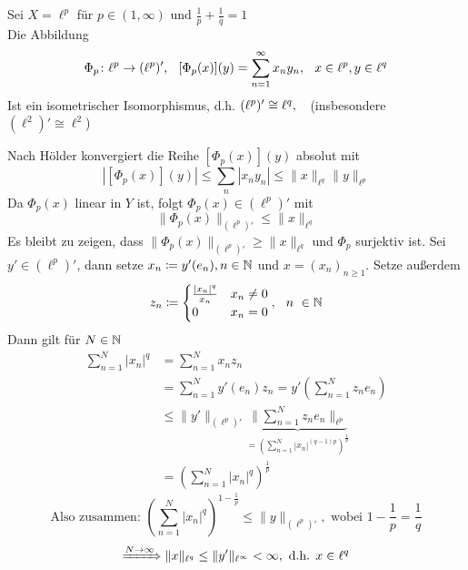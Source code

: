 \begin{beispiel}
	Sei $X = \ell^{p}$ für $p \in (1, \infty)$ und $\frac{1}{p} + \frac{1}{q} = 1$ \\
	Die Abbildung
	\[ \Phi_{p} \colon \ell^{p} \rightarrow (\ell^{p})', \hspace{0.25cm} [\Phi_{p}(x)](y) = \sum_{n = 1}^{\infty} x_{n} y_{n}, \hspace{0.25cm} x \in \ell^{p}, y \in \ell^{q}  \]
	Ist ein isometrischer Isomorphismus, d.h.  $(\ell^{p})' \cong \ell^{q}, \hspace{0.25cm}$ (insbesondere $(\ell^{2})' \cong \ell^{2}$)
	
	\begin{beweis}
		Nach Hölder konvergiert die Reihe $[\Phi_{p}(x)](y)$ absolut mit 
		\[ | [\Phi_{p}(x)](y) | \leq \sum_{n} |x_{n} y_{n}| \leq \| x \|_{\ell^{q}} \| y \|_{\ell^{p}} \]
		Da $\Phi_{p}(x)$ linear in $Y$ ist, folgt $\Phi_{p}(x) \in (\ell^{p})'$ mit
		\[ \| \Phi_{p}(x) \|_{(\ell^{p})'} \leq \| x \|_{\ell^{q}} \]
		Es bleibt zu zeigen, dass $ \| \Phi_{p}(x) \|_{(\ell^{p})'} \geq \| x \|_{\ell^{q}} $ und $\Phi_{p}$ surjektiv ist.
		Sei $y' \in (\ell^{p})'$, dann setze $x_{n} \coloneqq y'(e_{n}), n \in \mathbb{N}$ und $x = (x_{n})_{n \geq 1}$.
		Setze au{\ss}erdem
		\[ z_{n} \coloneqq \begin{cases} \frac{|x_{n}|^{q}}{x_{n}} & x_{n} \neq 0 \\ 0 & x_{n} = 0 \end{cases}, \hspace{0.25cm} n \ \in \mathbb{N} \]
		Dann gilt für $N \in \mathbb{N}$
		\begin{align*}
			\sum_{n=1}^{N} |x_{n}|^{q} & = \sum_{n = 1}^{N} x_{n} z_{n} \\
			& = \sum_{n = 1}^{N} y'(e_{n}) z_{n} = y'\left(\sum_{n = 1}^{N} z_{n} e_{n} \right) \\
			& \leq \| y' \|_{(\ell^{p})'} \underbrace{ \|  \sum_{n = 1}^{N} z_{n} e_{n} \|_{\ell^{p}} }_{= \left( \sum_{n = 1}^{N} |x_{n}|^{(q - 1)p} \right)^{\frac{1}{p}}} \\
			& = \left( \sum_{n = 1}^{N} |x_{n}|^{q}\right)^{\frac{1}{p}}
		\end{align*}
		\[ \text{Also zusammen: } \left( \sum_{n = 1}^{N} |x_{n}|^{q} \right)^{1-\frac{1}{p}} \leq \| y \|_{(\ell^{p})'}, \text{ wobei } 1 - \frac{1}{p} = \frac{1}{q} \]
		\begin{align}
			\xRightarrow{N \rightarrow \infty} \| x \|_{\ell^{q}} \leq \| y' \|_{\ell^{\infty}} < \infty, \text{ d.h. } x \in \ell^{q} \label{eq:3.14-proof-ineqlqlinf}			

\end{align}
\end{beweis}
\end{beispiel}
